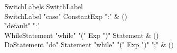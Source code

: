\begin{bbgrammar}
    \| SwitchLabels SwitchLabel\\
 SwitchLabel  \label{prod:SwitchLabel}  \: \xcd"case" ConstantExp \xcd":" & ()\\
    \| \xcd"default" \xcd":"\\
 WhileStatement  \label{prod:WhileStatement}  \: \xcd"while" \xcd"(" Exp \xcd")" Statement & ()\\
 DoStatement  \label{prod:DoStatement}  \: \xcd"do" Statement \xcd"while" \xcd"(" Exp \xcd")" \xcd";" & ()\\
\end{bbgrammar}

\begin{bbgrammar}


\end{bbgrammar}
